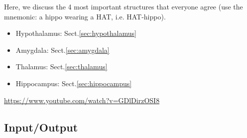Here, we discuss the 4 most important structures that everyone agree (use the
mnemonic: a hippo wearing a HAT, i.e. HAT-hippo).
\begin{itemize}
  \item Hypothalamus: Sect.\ref{sec:hypothalamus}
  \item Amygdala: Sect.\ref{sec:amygdala}
  \item Thalamus: Sect.\ref{sec:thalamus}
  \item Hippocampus: Sect.\ref{sec:hippocampus}
\end{itemize}
\url{https://www.youtube.com/watch?v=GDlDirzOSI8}

% 
% 
% 
% 
% 
% 


% 
\subsection{Input/Output}

